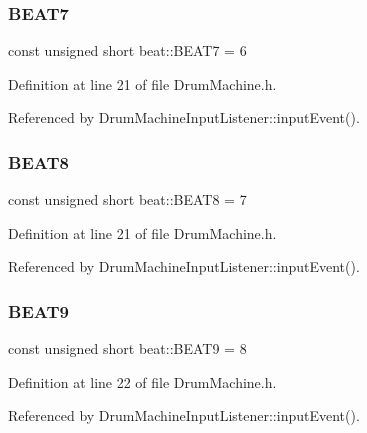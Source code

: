\mbox{\label{namespacebeat_af4ce75f48a22e0f3aacded8385030cad}} 
\subsubsection{\texorpdfstring{B\+E\+A\+T7}{BEAT7}}
{\footnotesize\ttfamily const unsigned short beat\+::\+B\+E\+A\+T7 = 6}



Definition at line 21 of file Drum\+Machine.\+h.



Referenced by Drum\+Machine\+Input\+Listener\+::input\+Event().

\mbox{\label{namespacebeat_a564212b647573e2f3fce876049227d2c}} 
\subsubsection{\texorpdfstring{B\+E\+A\+T8}{BEAT8}}
{\footnotesize\ttfamily const unsigned short beat\+::\+B\+E\+A\+T8 = 7}



Definition at line 21 of file Drum\+Machine.\+h.



Referenced by Drum\+Machine\+Input\+Listener\+::input\+Event().

\mbox{\label{namespacebeat_a6558138490436cdf9a77d90ffd07e092}} 
\subsubsection{\texorpdfstring{B\+E\+A\+T9}{BEAT9}}
{\footnotesize\ttfamily const unsigned short beat\+::\+B\+E\+A\+T9 = 8}



Definition at line 22 of file Drum\+Machine.\+h.



Referenced by Drum\+Machine\+Input\+Listener\+::input\+Event().

